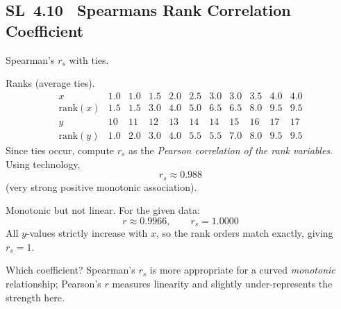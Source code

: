 \documentclass[11pt]{article}
\def\textbf#1{#1}%
\def\textit#1{#1}%
\newcommand{\tocsubsection}[1]{\subsection{#1}}
\begin{document}
\tocsubsection{SL 4.10 \; Spearmans Rank Correlation Coefficient}


\providecommand{\pt}[2]{\fill (#1,#2) circle (1.6pt);} %

\begin{solution}
\textbf{Spearman’s $r_s$ with ties.}

\textit{Ranks (average ties).}
\[
\begin{array}{c|cccccccccc}
x & 1.0 & 1.0 & 1.5 & 2.0 & 2.5 & 3.0 & 3.0 & 3.5 & 4.0 & 4.0\\
\text{rank}(x) & 1.5 & 1.5 & 3.0 & 4.0 & 5.0 & 6.5 & 6.5 & 8.0 & 9.5 & 9.5\\
\hline
y & 10 & 11 & 12 & 13 & 14 & 14 & 15 & 16 & 17 & 17\\
\text{rank}(y) & 1.0 & 2.0 & 3.0 & 4.0 & 5.5 & 5.5 & 7.0 & 8.0 & 9.5 & 9.5
\end{array}
\]
Since ties occur, compute $r_s$ as the \emph{Pearson correlation of the rank variables}.
Using technology,
\[
\boxed{\,r_s \approx 0.988\,}
\]
(very strong positive monotonic association).

\begin{center}
\end{center}
\end{solution}

\begin{solution}
\textbf{Monotonic but not linear.}
For the given data:
\[
\boxed{\,r \approx 0.9966,\qquad r_s = 1.0000\,}
\]
All $y$-values strictly increase with $x$, so the rank orders match exactly, giving $r_s=1$.
\medskip

\textit{Which coefficient?} Spearman’s $r_s$ is more appropriate for a curved \emph{monotonic} relationship; Pearson’s $r$
measures linearity and slightly under-represents the strength here.
\end{solution}
\end{document}
